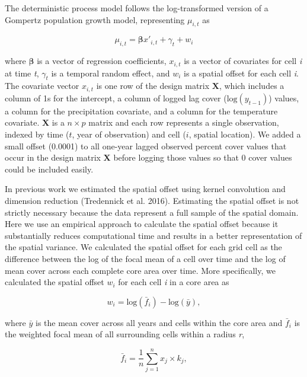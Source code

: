 \documentclass[
  12pt,
]{article}
\begin{document}
\noindent{}The deterministic process model follows the log-transformed version of a Gompertz population growth model, representing \(\mu_{i,t}\) as

\begin{equation}
\label{eq:regression}
\mu_{i,t} = \bm{\beta} x'_{i,t} + \gamma_{t} + w_{i}
\end{equation}

\noindent{}where \(\bm{\beta}\) is a vector of regression coefficients, \(x_{i,t}\) is a vector of covariates for cell \emph{i} at time \emph{t}, \(\gamma_{t}\) is a temporal random effect, and \(w_i\) is a spatial offset for each cell \emph{i}.
The covariate vector \(x_{i,t}\) is one row of the design matrix \(\textbf{X}\), which includes a column of 1s for the intercept, a column of logged lag cover (\(\text{log}(y_{t-1})\)) values, a column for the precipitation covariate, and a column for the temperature covariate.
\(\textbf{X}\) is a \(n \times p\) matrix and each row represents a single observation, indexed by time (\(t\), year of observation) and cell (\(i\), spatial location).
We added a small offset (0.0001) to all one-year lagged observed percent cover values that occur in the design matrix \(\textbf{X}\) before logging those values so that 0 cover values could be included easily.

In previous work we estimated the spatial offset using kernel convolution and dimension reduction (Tredennick et al. 2016).
Estimating the spatial offset is not strictly necessary because the data represent a full sample of the spatial domain.
Here we use an empirical approach to calculate the spatial offset because it substantially reduces computational time and results in a better representation of the spatial variance.
We calculated the spatial offset for each grid cell as the difference between the log of the focal mean of a cell over time and the log of mean cover across each complete core area over time. More specifically, we calculated the spatial offset \(w_i\) for each cell \emph{i} in a core area as

\begin{equation}
w_{i} = {\text{log}(\bar{f}_{i}) - \text{log}(\bar{y})},
\end{equation}

\noindent{}where \(\bar{y}\) is the mean cover across all years and cells within the core area and \(\bar{f}_{i}\) is the weighted focal mean of all surrounding cells within a radius \emph{r},

\begin{equation}
\bar{f}_{i} = \frac{1}{n} \sum_{j=1}^{n}x_{j} \times k_{j},
\end{equation}
\end{document}
